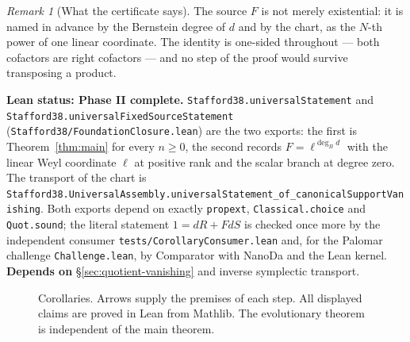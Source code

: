 \documentclass[11pt]{article}
\theoremstyle{plain}
\theoremstyle{definition}
\theoremstyle{remark}
\newtheorem{remark}[theorem]{Remark}
\theoremstyle{plain}
\newcommand{\mapnode}[2]{\hyperref[sec:#1]{#2}}
\newcommand{\ndtag}[2]{{\scriptsize\sffamily\bfseries\color{#1}#2}\\[1.5pt]}
\begin{document}
\begin{remark}[What the certificate says]
The source $F$ is not merely existential: it is named in advance by the
Bernstein degree of $d$ and by the chart, as the $N$-th power of one linear
coordinate. The identity is one-sided throughout --- both cofactors are right
cofactors --- and no step of the proof would survive transposing a product.
\end{remark}

\begin{provbox}
\textbf{Lean status: Phase II complete.}
\texttt{Stafford38.universalStatement} and
\texttt{Stafford38.universalFixedSourceStatement}
(\texttt{Stafford38/FoundationClosure.lean}) are the two exports: the first is
Theorem~\ref{thm:main} for every $n\ge0$, the second records
$F=\ell^{\deg_Bd}$ with the linear Weyl coordinate $\ell$ at positive rank
and the scalar branch at degree zero. The transport of the chart is
\texttt{Stafford38.\allowbreak UniversalAssembly.\allowbreak universalStatement\_of\_canonicalSupportVanishing}.
Both exports depend on exactly \texttt{propext}, \texttt{Classical.choice}
and \texttt{Quot.sound}; the literal statement $1=dR+FdS$ is checked once
more by the independent consumer \texttt{tests/CorollaryConsumer.lean} and,
for the Palomar challenge \texttt{Challenge.lean}, by Comparator with NanoDa
and the Lean kernel.
\textbf{Depends on} \S\ref{sec:quotient-vanishing} and inverse symplectic transport.
\end{provbox}



\clearpage
\begin{figure}[!ht]
\centering
{}
\caption{Corollaries. Arrows supply the premises of each step.
All displayed claims are proved in Lean from Mathlib.
The evolutionary theorem is independent of the main theorem.}
\label{fig:corollaries}
\end{figure}
\end{document}
